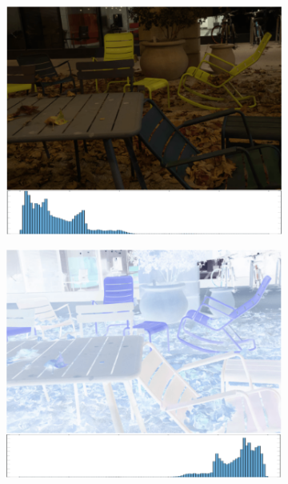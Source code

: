 \documentclass[letterpaper,12pt]{article}
\begin{document}
		\begin{figure}[htbp] 
			\centering 
			\begin{subfigure}{0.22\textwidth}
				\includegraphics[width=\linewidth]{effect_of_contrast/a}
				\captionsetup{font=scriptsize}
				\caption{}
				\label{fig: Effect_a}
			\end{subfigure}
			\begin{subfigure}{0.22\textwidth}
				\includegraphics[width=\linewidth]{effect_of_contrast/b}
				\captionsetup{font=scriptsize}
				\caption{}
				\label{fig: Effect_b}

\end{subfigure}
\end{figure}
\end{document}
